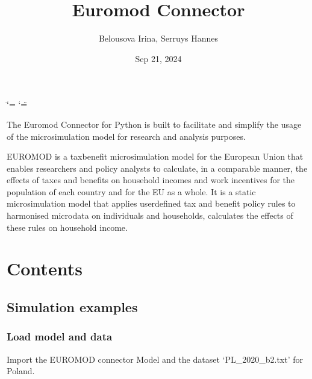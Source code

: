 \documentclass[letterpaper,10pt,english]{sphinxmanual}
\title{Euromod Connector}
\date{Sep 21, 2024}
\author{Belousova Irina, Serruys Hannes}
\begin{document}
\ifdefined\shorthandoff
  \ifnum\catcode`\=\string=\active\shorthandoff{=}\fi
  \ifnum\catcode`\"=\active{}\fi
\fi

\pagestyle{empty}
\sphinxmaketitle
\pagestyle{plain}
\sphinxtableofcontents
\pagestyle{normal}
\label{\detokenize{index::doc}}


\sphinxAtStartPar
The Euromod Connector for Python is built to facilitate and simplify the usage of the  microsimulation model for research and analysis purposes.

\sphinxAtStartPar
EUROMOD is a tax\sphinxhyphen{}benefit microsimulation model for the European Union that enables researchers and policy analysts to calculate, in a comparable manner, the effects of taxes and benefits on household incomes and work incentives for the population of each country and for the EU as a whole. It is a static microsimulation model that applies user\sphinxhyphen{}defined tax and benefit policy rules to harmonised microdata on individuals and households, calculates the effects of these rules on household income.


\chapter{Contents}
\label{\detokenize{index:contents}}
\sphinxstepscope


\section{Simulation examples}
\label{\detokenize{notebooks/example:simulation-examples}}\label{\detokenize{notebooks/example::doc}}

\subsection{Load model and data}
\label{\detokenize{notebooks/example:load-model-and-data}}
\sphinxAtStartPar
Import the EUROMOD connector Model and the dataset ‘PL\_2020\_b2.txt’ for Poland.
\end{document}
